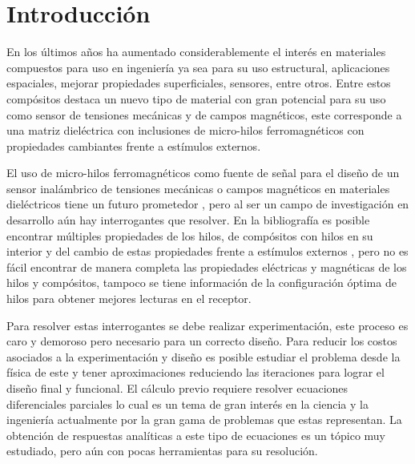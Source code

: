 \documentclass[12pt,letterpaper]{article}
\numberwithin{equation}{section}
\begin{document}
\pagebreak
{}
\section{Introducción}
En los últimos años  ha aumentado considerablemente el interés en materiales compuestos para uso en ingeniería ya sea para su uso estructural, aplicaciones espaciales, mejorar propiedades superficiales, sensores, entre otros. Entre estos compósitos destaca un nuevo tipo de material con gran potencial para su uso como sensor de tensiones mecánicas y de campos magnéticos, este corresponde a una matriz dieléctrica con inclusiones de micro-hilos ferromagnéticos con propiedades cambiantes frente a estímulos externos.

El uso de micro-hilos ferromagnéticos como fuente de señal para el diseño de un sensor inalámbrico de tensiones mecánicas o campos magnéticos en materiales dieléctricos tiene un futuro prometedor \cite{Wire_intro}, pero al ser un campo de investigación en desarrollo aún hay interrogantes que resolver. En la bibliografía es posible encontrar múltiples propiedades de los hilos, de compósitos con hilos en su interior y del cambio de estas propiedades frente a estímulos externos \cite{Wire_intro,Wire_backgound,Wire_permeability}, pero no es fácil encontrar de manera completa las propiedades eléctricas y magnéticas de los hilos y compósitos, tampoco se tiene información de la configuración óptima de hilos para obtener mejores lecturas en el receptor. 

Para resolver estas interrogantes se debe realizar experimentación, este proceso es caro y demoroso pero necesario para un correcto diseño. Para reducir los costos asociados a la experimentación y diseño es posible estudiar el problema desde la física de este y tener aproximaciones reduciendo las iteraciones para lograr el diseño final y funcional. El cálculo previo requiere resolver ecuaciones diferenciales parciales lo cual es un tema de gran interés en la ciencia y la ingeniería actualmente por la gran gama de problemas que estas representan. La obtención de respuestas analíticas a este tipo de ecuaciones es un tópico muy estudiado, pero aún con pocas herramientas para su resolución.
\end{document}

